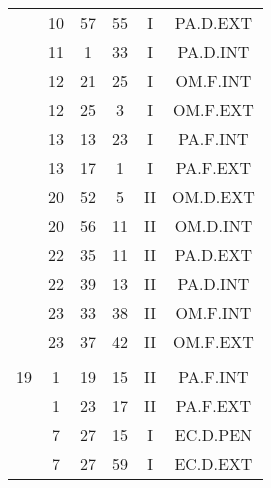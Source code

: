 \documentclass[12pt, a4paper]{article}
\begin{document}
\begin{multicols}{3}
{\begin{tabular}{c c c c c c}
	 	 	 	 & 10 & 57 & 55 & I & PA.D.EXT\\%
	 	 	 	 & 11 & 1 & 33 & I & PA.D.INT\\%
	 	 	 	 & 12 & 21 & 25 & I & OM.F.INT\\%
	 	 	 	 & 12 & 25 & 3 & I & OM.F.EXT\\%
	 	 	 	 & 13 & 13 & 23 & I & PA.F.INT\\%
	 	 	 	 & 13 & 17 & 1 & I & PA.F.EXT\\%
	 	 	 	 & 20 & 52 & 5 & II & OM.D.EXT\\%
	 	 	 	 & 20 & 56 & 11 & II & OM.D.INT\\%
	 	 	 	 & 22 & 35 & 11 & II & PA.D.EXT\\%
	 	 	 	 & 22 & 39 & 13 & II & PA.D.INT\\%
	 	 	 	 & 23 & 33 & 38 & II & OM.F.INT\\%
	 	 	 	 & 23 & 37 & 42 & II & OM.F.EXT\\%
	 	 	 	 & & & & & \\%
	 	 	 	19 & 1 & 19 & 15 & II & PA.F.INT\\%
	 	 	 	 & 1 & 23 & 17 & II & PA.F.EXT\\%
	 	 	 	 & 7 & 27 & 15 & I & EC.D.PEN\\%
	 	 	 	 & 7 & 27 & 59 & I & EC.D.EXT\\%
	 	 \end{tabular}
 	}
\end{multicols}
\end{document}
